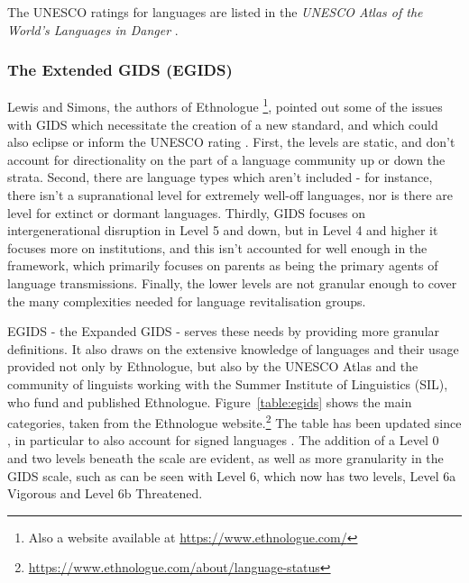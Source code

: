 The UNESCO ratings for languages are listed in the \textit{UNESCO Atlas of the World's Languages in Danger} \citep{unesco2014unesco}.

\subsubsection{The Extended GIDS (EGIDS)}

Lewis and Simons, the authors of Ethnologue \citep{lewis2009ethnologue}\footnote{Also a website available at \href{https://www.ethnologue.com/}{https://www.ethnologue.com/}}, pointed out some of the issues with GIDS which necessitate the creation of a new standard, and which could also eclipse or inform the UNESCO rating \citep{lewis2010assessing}. First, the levels are static, and don't account for directionality on the part of a language community up or down the strata. Second, there are language types which aren't included - for instance, there isn't a supranational level for extremely well-off languages, nor is there are level for extinct or dormant languages. Thirdly, GIDS focuses on intergenerational disruption in Level 5 and down, but in Level 4 and higher it focuses more on institutions, and this isn't accounted for well enough in the framework, which primarily focuses on parents as being the primary agents of language transmissions. Finally, the lower levels are not granular enough to cover the many complexities needed for language revitalisation groups.

EGIDS - the Expanded GIDS - serves these needs by providing more granular definitions. It also draws on the extensive knowledge of languages and their usage provided not only by Ethnologue, but also by the UNESCO Atlas and the community of linguists working with the Summer Institute of Linguistics (SIL), who fund and published Ethnologue. Figure~\ref{table:egids} shows the main categories, taken from the Ethnologue website.\footnote{\href{https://www.ethnologue.com/about/language-status}{https://www.ethnologue.com/about/language-status}} The table has been updated since \citet{lewis2010assessing}, in particular to also account for signed languages \citep{bickford2015rating}. The addition of a Level 0 and two levels beneath the scale are evident, as well as more granularity in the GIDS scale, such as can be seen with Level 6, which now has two levels, Level 6a Vigorous and Level 6b Threatened.

